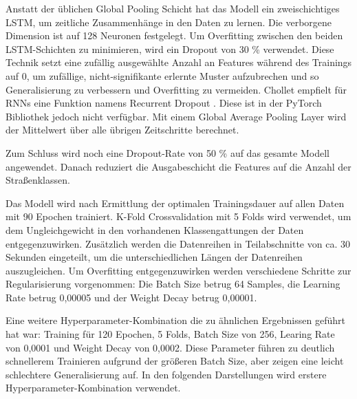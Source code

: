 Anstatt der üblichen Global Pooling Schicht hat das Modell ein zweischichtiges LSTM, um zeitliche Zusammenhänge in den Daten zu lernen. Die verborgene Dimension ist auf 128 Neuronen festgelegt. Um Overfitting zwischen den beiden LSTM-Schichten zu minimieren, wird ein Dropout von 30 \%  verwendet. Diese Technik setzt eine zufällig ausgewählte Anzahl an Features während des Trainings auf 0, um zufällige, nicht-signifikante erlernte Muster aufzubrechen und so Generalisierung zu verbessern und Overfitting zu vermeiden. Chollet empfielt für RNNs eine Funktion namens Recurrent Dropout \cite{Chollet2025}. Diese ist in der PyTorch Bibliothek jedoch nicht verfügbar. Mit einem Global Average Pooling Layer wird der Mittelwert über alle übrigen Zeitschritte berechnet. 

Zum Schluss wird noch eine Dropout-Rate von 50 \% auf das gesamte Modell angewendet. Danach reduziert die Ausgabeschicht die Features auf die Anzahl der Straßenklassen.

Das Modell wird nach Ermittlung der optimalen Trainingsdauer auf allen Daten mit 90 Epochen trainiert. K-Fold Crossvalidation mit 5 Folds wird verwendet, um dem Ungleichgewicht in den vorhandenen Klassengattungen der Daten entgegenzuwirken. Zusätzlich werden die Datenreihen in Teilabschnitte von ca. 30 Sekunden eingeteilt, um die unterschiedlichen Längen der Datenreihen auszugleichen. Um Overfitting entgegenzuwirken werden verschiedene Schritte zur Regularisierung vorgenommen: Die Batch Size betrug 64 Samples, die Learning Rate betrug 0,00005 und der Weight Decay betrug 0,00001.

Eine weitere Hyperparameter-Kombination die zu ähnlichen Ergebnissen geführt hat war: Training für 120 Epochen, 5 Folds, Batch Size von 256, Learing Rate von 0,0001 und Weight Decay von 0,0002. Diese Parameter führen zu deutlich schnellerem Trainieren aufgrund der größeren Batch Size, aber zeigen eine leicht schlechtere Generalisierung auf. In den folgenden Darstellungen wird erstere Hyperparameter-Kombination verwendet.

